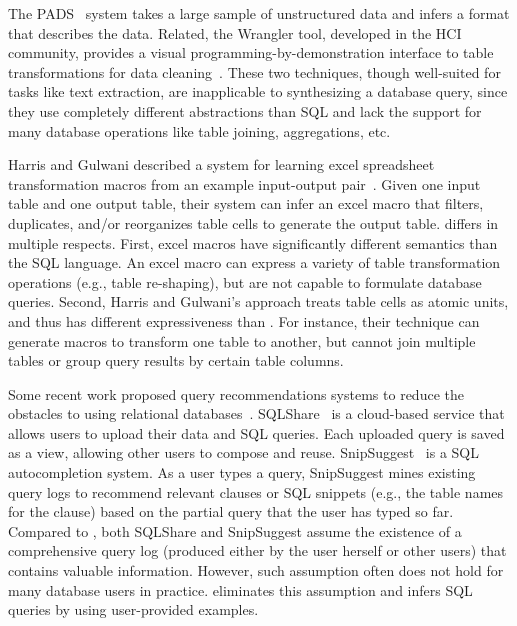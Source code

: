 The PADS~\cite{Fisher:2008} system takes a large sample
of unstructured data and infers a
format that describes the data. Related,
the Wrangler tool, developed in the HCI community,
provides a visual programming-by-demonstration
interface to table transformations for data cleaning~\cite{Kandel:2011}.
These two techniques, though well-suited for tasks
like text extraction, are inapplicable to
synthesizing  a database query, since they use completely
different abstractions than SQL and lack the support
for many database operations like table joining, aggregations, etc.


Harris and Gulwani described a system for learning excel
spreadsheet transformation macros from an example
input-output pair~\cite{Harris:2011}. Given one input table and one output
table, their system can infer an excel macro that filters,
duplicates, and/or reorganizes table cells to generate the output table.
\ourtool differs in multiple respects.
First, excel macros have significantly different
semantics than the SQL language.
An excel macro can express a variety of table transformation operations
(e.g., table re-shaping), but are not capable to formulate database queries.
Second, Harris and Gulwani's approach treats table cells
as atomic units, and thus has different expressiveness
than \ourtool. For instance, their technique can generate macros to
transform one table to another, but cannot join multiple
tables or group query results by certain table columns. 




Some recent work proposed query recommendations systems to reduce
the obstacles to using relational databases~\cite{Howe:2011, Khoussainova:2010}. 
SQLShare~\cite{Howe:2011} is a cloud-based service that allows
users to upload their data and SQL queries. 
Each uploaded query is saved as a view, allowing other users
to compose and reuse. SnipSuggest~\cite{Khoussainova:2010} is a SQL autocompletion
system. As a user types a query, SnipSuggest mines existing query
logs to recommend relevant clauses or SQL snippets (e.g., the table
names for the  clause) based on the partial query that
the user has typed so far.
Compared to \ourtool, both SQLShare and SnipSuggest assume the
existence of a comprehensive query log (produced either
by the user herself or other users)
that contains valuable information.
However, such assumption often does not hold for
many database users in practice.
\ourtool eliminates this assumption and infers 
SQL queries by using user-provided examples.



